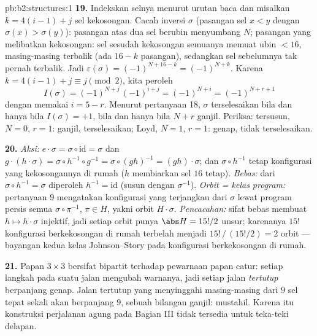 \begin{solution}{pb:b2:structures:1}
\textbf{19.} Indekskan selnya menurut urutan baca dan misalkan $k = 4(i
- 1) + j$ sel kekosongan. Cacah inversi $\sigma$
(pasangan sel $x < y$ dengan $\sigma(x) > \sigma(y)$): pasangan atas
dua sel berubin menyumbang $N$; pasangan yang melibatkan kekosongan:
sel sesudah kekosongan semuanya memuat ubin $< 16$, masing-masing
terbalik (ada $16 - k$ pasangan), sedangkan sel sebelumnya tak pernah
terbalik. Jadi $\varepsilon(\sigma) = (-1)^{N + 16 - k} = (-1)^{N + k}$.
Karena $k = 4(i-1) + j \equiv j \pmod 2$, kita peroleh
\[
I(\sigma) = (-1)^{N + j}\,(-1)^{i + j} = (-1)^{N + i}
= (-1)^{N + r + 1}
\]
dengan memakai $i = 5 - r$. Menurut pertanyaan 18, $\sigma$ terselesaikan
bila dan hanya bila $I(\sigma) = +1$, bila dan hanya bila $N + r$ ganjil.
Periksa: tersusun, $N = 0$, $r = 1$: ganjil, terselesaikan; Loyd, $N =
1$, $r = 1$: genap, tidak terselesaikan.

\textbf{20.} \emph{Aksi:} $e \cdot \sigma = \sigma \circ
\mathrm{id} = \sigma$ dan $g \cdot (h \cdot \sigma) = \sigma
\circ h^{-1} \circ g^{-1} = \sigma \circ (gh)^{-1} = (gh) \cdot
\sigma$; dan $\sigma \circ h^{-1}$ tetap konfigurasi yang
kekosongannya di rumah ($h$ membiarkan sel $16$ tetap). \emph{Bebas:}
dari $\sigma \circ h^{-1} = \sigma$ diperoleh $h^{-1} = \mathrm{id}$
(susun dengan $\sigma^{-1}$). \emph{Orbit = kelas program:} pertanyaan 9
mengatakan konfigurasi yang terjangkau dari $\sigma$ lewat program
persis semua $\sigma \circ \pi^{-1}$, $\pi \in H$, yakni orbit $H
\cdot \sigma$. \emph{Pencacahan:} sifat bebas membuat $h \mapsto h \cdot
\sigma$ injektif, jadi setiap orbit punya $\abs H = 15!/2$ unsur;
karenanya $15!$ konfigurasi berkekosongan di rumah terbelah menjadi
$15!\,/\,(15!/2) = 2$ orbit --- bayangan kedua kelas Johnson--Story pada
konfigurasi berkekosongan di rumah.

\textbf{21.} Papan $3 \times 3$ bersifat bipartit terhadap pewarnaan
papan catur: setiap langkah pada suatu jalan mengubah warnanya, jadi
setiap jalan \emph{tertutup} berpanjang genap. Jalan tertutup yang
menyinggahi masing-masing dari $9$ sel tepat sekali akan berpanjang $9$,
sebuah bilangan ganjil: mustahil. Karena itu konstruksi perjalanan agung
pada Bagian III tidak tersedia untuk teka-teki delapan.


\end{solution}
